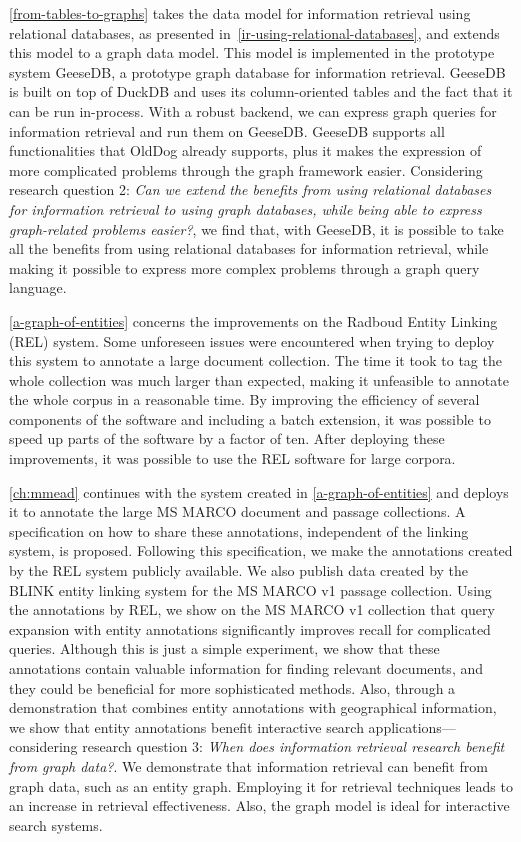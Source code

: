 \cref{from-tables-to-graphs} takes the data model for information retrieval using relational databases, as presented in~\cref{ir-using-relational-databases}, and extends this model to a graph data model. This model is implemented in the prototype system GeeseDB, a prototype graph database for information retrieval. GeeseDB is built on top of DuckDB and uses its column-oriented tables and the fact that it can be run in-process. With a robust backend, we can express graph queries for information retrieval and run them on GeeseDB. GeeseDB supports all functionalities that OldDog already supports, plus it makes the expression of more complicated problems through the graph framework easier. Considering research question 2: \emph{Can we extend the benefits from using relational databases for information retrieval to using graph databases, while being able to express graph-related problems easier?}, we find that, with GeeseDB, it is possible to take all the benefits from using relational databases for information retrieval, while making it possible to express more complex problems through a graph query language.

\cref{a-graph-of-entities} concerns the improvements on the Radboud Entity Linking (REL) system. Some unforeseen issues were encountered when trying to deploy this system to annotate a large document collection. The time it took to tag the whole collection was much larger than expected, making it unfeasible to annotate the whole corpus in a reasonable time. By improving the efficiency of several components of the software and including a batch extension, it was possible to speed up parts of the software by a factor of ten. After deploying these improvements, it was possible to use the REL software for large corpora. 

\cref{ch:mmead} continues with the system created in \cref{a-graph-of-entities} and deploys it to annotate the large MS MARCO document and passage collections. A specification on how to share these annotations, independent of the linking system, is proposed. Following this specification, we make the annotations created by the REL system publicly available. We also publish data created by the BLINK entity linking system for the MS MARCO v1 passage collection. Using the annotations by REL, we show on the MS MARCO v1 collection that query expansion with entity annotations significantly improves recall for complicated queries. Although this is just a simple experiment, we show that these annotations contain valuable information for finding relevant documents, and they could be beneficial for more sophisticated methods. Also, through a demonstration that combines entity annotations with geographical information, we show that entity annotations benefit interactive search applications—considering research question 3: \emph{When does information retrieval research benefit from graph data?}. We demonstrate that information retrieval can benefit from graph data, such as an entity graph. Employing it for retrieval techniques leads to an increase in retrieval effectiveness. Also, the graph model is ideal for interactive search systems. 

